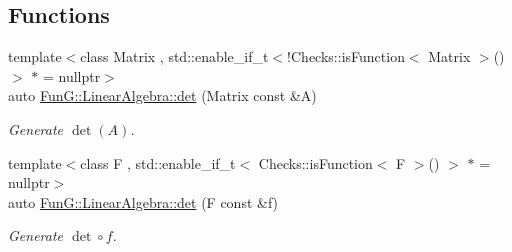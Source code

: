 \subsection*{Functions}
\begin{DoxyCompactItemize}
\item 
{\footnotesize template$<$class Matrix , std\+::enable\+\_\+if\+\_\+t$<$!\+Checks\+::is\+Function$<$ Matrix $>$()$>$ $\ast$  = nullptr$>$ }\\auto \hyperlink{group__LinearAlgebraGroup_gadb3017b4b2828e25a0784b10396a836f}{Fun\+G\+::\+Linear\+Algebra\+::det} (Matrix const \&A)
\begin{DoxyCompactList}\small\item\em Generate $\det(A)$. \end{DoxyCompactList}\item 
{\footnotesize template$<$class F , std\+::enable\+\_\+if\+\_\+t$<$ Checks\+::is\+Function$<$ F $>$() $>$ $\ast$  = nullptr$>$ }\\auto \hyperlink{group__LinearAlgebraGroup_ga552048de67f3412ae0a220b3123db6e5}{Fun\+G\+::\+Linear\+Algebra\+::det} (F const \&f)
\begin{DoxyCompactList}\small\item\em Generate $\det\circ f$. \end{DoxyCompactList}\end{DoxyCompactItemize}

